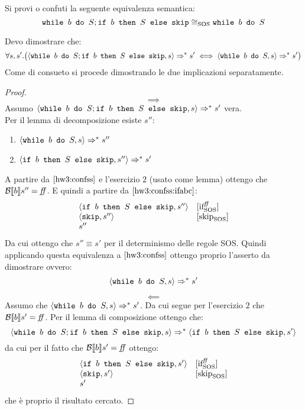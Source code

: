 {
  Si provi o confuti la seguente equivalenza semantica:
  $$
  \wbS{b}{S}; \ifABC{b}{S}{\skipForFriends} \eqSOS \wbS{b}{S}
  $$
}
{
  Devo dimostrare che:
  $$
  \forall s, s'. \big( \confSs{\wbS{b}{S}; \ifABC{b}{S}{\skipForFriends}}{s}
  \Rar{*} s' \iff \confSs{\wbS{b}{S}}{s} \Rar{*} s'\big)
  $$
  Come di consueto si procede dimostrando le due implicazioni separatamente.
  \begin{proof}
    $$
    \boxed{\implies}
    $$
    Assumo $\confSs{\wbS{b}{S}; \ifABC{b}{S}{\skipForFriends}}{s} \Rar{*}
    s'$ vera. \\
    Per il lemma di decomposizione esiste $s''$:
    \begin{enumerate}
    \item $\confSs{\wbS{b}{S}}{s} \Rar{*} s''$
      \label{hw3:confss}
    \item $\confSs{\ifABC{b}{S}{\skipForFriends}}{s''} \Rar{*} s'$
      \label{hw3:confss:ifabc}
    \end{enumerate}
    A partire da $\ref{hw3:confss}$ e l'esercizio $2$ (usato come lemma) 
   ottengo che $\B{b}'' =
    \semfalse$. E quindi a partire da $\ref{hw3:confss:ifabc}$:
    $$
    \begin{array}{ll}
      \confSs{\ifABC{b}{S}{\skipForFriends}}{s''} & \ifffSOS \\
      \confSs{\skipForFriends}{s''} & \skipSOS \\
      s''
    \end{array}
    $$
    Da cui ottengo che $\boxed{s'' \equiv s'}$ per il determinismo delle regole SOS.
    Quindi applicando questa equivalenza a $\ref{hw3:confss}$ ottengo proprio
    l'asserto da dimostrare ovvero:
    $$
    \confSs{\wbS{b}{S}}{s} \Rar{*} s'
    $$
    
    $$
    \boxed{\impliedby}
    $$
    Assumo che $\confSs{\wbS{b}{S}}{s} \Rar{*} s'$. Da cui segue per
    l'esercizio $2$ che $\B{b}' = \semfalse$.
    Per il lemma di composizione ottengo che:
    $$
    \confSs{\wbS{b}{S}; \ifABC{b}{S}{\skipForFriends}}{s} \Rar{*} \confSs{\ifABC{b}{S}{\skipForFriends}}{s'}
    $$
    da cui per il fatto che $\B{b}' = \semfalse$ ottengo:
    $$
    \begin{array}{ll}
      \confSs{\ifABC{b}{S}{\skipForFriends}}{s'} & \ifffSOS \\
      \confSs{\skipForFriends}{s'} & \skipSOS \\
      s' & \\
    \end{array}
    $$
    che è proprio il risultato cercato.
  
    
  

  \end{proof}
  
}
